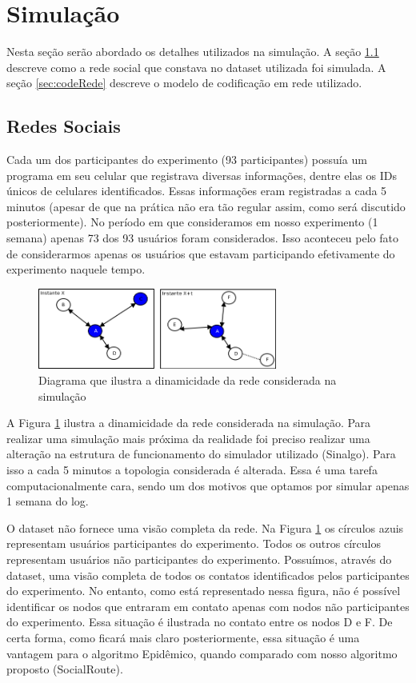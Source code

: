 \section{Simulação}
\label{simulacao}

Nesta seção serão abordado os detalhes utilizados na simulação. A seção
\ref{sec:redesSociais} 
descreve como a rede social que constava no dataset utilizada foi
simulada. A seção \ref{sec:codeRede} descreve o modelo de codificação em
rede utilizado.

\subsection{Redes Sociais} \label{sec:redesSociais}

Cada um dos participantes do experimento (93 participantes) possuía um
programa em seu celular que registrava diversas informações, dentre elas
os IDs únicos de celulares identificados. Essas informações eram
registradas a cada 5 minutos (apesar de que na prática não era tão
regular assim, como será discutido posteriormente). No período em que
consideramos em nosso experimento (1 semana) apenas 73 dos 93 usuários
foram considerados. Isso aconteceu pelo fato de considerarmos apenas os
usuários que estavam participando efetivamente do experimento naquele
tempo.

\begin{figure}[ht]
\centering
\includegraphics[width=0.7\textwidth]{img/diagramas/redeSocial.png}
\caption{Diagrama que ilustra a dinamicidade da rede considerada na
simulação}
\label{fig:diagramaRedeSocial}
\end{figure}


A Figura \ref{fig:diagramaRedeSocial} ilustra a dinamicidade da rede
considerada na simulação. Para realizar uma simulação mais próxima da
realidade foi preciso realizar uma alteração na estrutura de
funcionamento do simulador utilizado (Sinalgo). Para isso a cada 5
minutos a topologia considerada é alterada. Essa é uma tarefa
computacionalmente cara, sendo um dos motivos que optamos por simular
apenas 1 semana do log. 

O dataset não fornece uma visão completa da rede. Na Figura
\ref{fig:diagramaRedeSocial} os círculos azuis representam usuários
participantes do experimento. Todos os outros círculos representam
usuários não participantes do experimento. Possuímos, através do
dataset, uma visão completa de todos os contatos identificados pelos
participantes do experimento. No entanto, como está representado nessa
figura, não é possível identificar os nodos que entraram em contato
apenas com nodos não participantes do experimento. Essa situação é
ilustrada no contato entre os nodos D e F. De certa forma, como ficará
mais claro posteriormente, essa situação é uma vantagem para o algoritmo
Epidêmico, quando comparado com nosso algoritmo proposto (SocialRoute).


